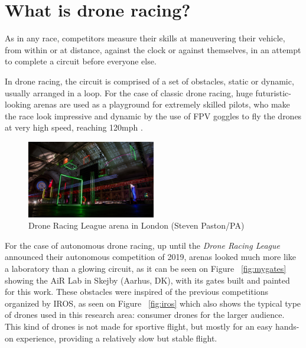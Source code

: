 \section{What is drone racing?}

As in any race, competitors measure their skills at maneuvering their vehicle,
from within or at distance, against the clock or against themselves, in an
attempt to complete a circuit before everyone else.

In drone racing, the circuit is comprised of a set of obstacles, static or
dynamic, usually arranged in a loop. For the case of classic drone racing, huge
futuristic-looking arenas are used as a playground for extremely skilled pilots,
who make the race look impressive and dynamic by the use of FPV goggles to fly
the drones at very high speed, reaching 120mph
\cite{https://thedroneracingleague.com/learn-more/}.

\begin{figure}[h]
	\centering
	\includegraphics[width=0.5\textwidth]{figure/drl_arena.jpg}
	\caption{Drone Racing League arena in London (Steven Paston/PA)}
\end{figure}

	
For the case of autonomous drone racing, up until the \emph{Drone Racing
League} announced their autonomous competition of 2019, arenas looked much more
like a laboratory than a glowing circuit, as it can be seen on Figure
~\ref{fig:mygates} showing the AiR Lab in Skejby (Aarhus, DK), with its gates
built and painted for this work. These obstacles were inspired of the previous
competitions organized by IROS, as seen on Figure ~\ref{fig:iros} which also
shows the typical type of drones used in this research area: consumer drones
for the larger audience. This kind of drones is not made for sportive flight,
but mostly for an easy hands-on experience, providing a relatively slow but
stable flight.

